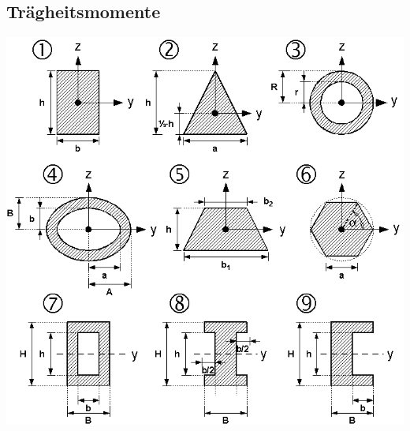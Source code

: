 \begin{multicols}{3}
	\section{Trägheitsmomente} %
		\begin{center}
			\includegraphics[width=\columnwidth]{graphics/traegheit}
		\end{center}
		

\end{multicols}
